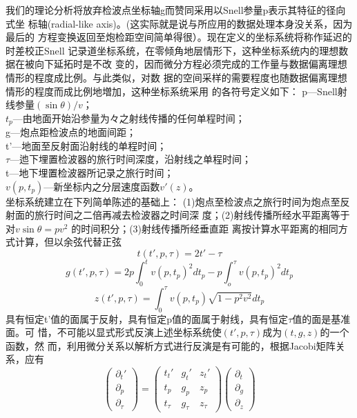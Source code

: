 我们的理论分析将放弃检波点坐标轴g而赞同采用以Snell参量p表示其特征的径向式坐
标轴(radial-like axis)。(这实际就是说与所应用的数据处理本身没关系，因为最后的
方程变换返回至炮检距空间简单得很）。现在定义的坐标系统将称作延迟的时差校正Snell
记录道坐标系统，在零倾角地层情形下，这种坐标系统内的理想数据在被向下延拓时是不改
变的，因而微分方程必须完成的工作量与数据偏离理想情形的程度成比例。与此类似，对数
据的空间采样的需要程度也随数据偏离理想情形的程度而成比例地増加，这种坐标系统采用
的各符号定义如下：
p---Snell射线参量$(\sin\theta)/v$；\\
$t_p$---由地面开始沿参量为々之射线传播的任何单程时间；\\
g---炮点距检波点的地面间距； \\
t'---地面至反射面沿射线的单程时间；\\
$\tau$---迆下埋置检波器的旅行时间深度，沿射线之单程时间；\\
t---地下埋置检波器所记录之旅行时间；\\
$v(p,t_p)$---新坐标内之分层速度函数$v'(z)$。\\
坐标系统建立在下列简单陈述的基础上：
(1)炮点至检波点之旅行时间为炮点至反射面的旅行时间之二倍再减去检波器之时间深
度；(2)射线传播所经水平距离等于对$v\sin\theta=pv^2$
的时间积分；(3)射线传播所经垂直距
离按计算水平距离的相同方式计算，但以余弦代替正弦
\begin{equation}
t(t',p,\tau)=2t'-\tau
\label{eq:ex5.7.1}
\end{equation}
\begin{equation}
g(t',p,\tau)=2p\int_0^tv(p,t_p)^2dt_p-p\int_o^{\tau}v(p,t_p)^2dt_p
\label{eq:ex5.7.2}
\end{equation}
\begin{equation}
z(t',p,\tau)=\int_0^\tau v(p,t_p)\sqrt{1-p^2v^2}dt_p
\label{eq:ex5.7.3}
\end{equation}
具有恒定t'值的面属于反射，具有恒定p值的面属于射线，具有恒定$\tau$值的面是基准面。可
惜，不可能以显式形式反演上述坐标系统使$(t',p,\tau)$成为$(t,g,z)$的一个函数，然
而，利用微分关系以解析方式进行反演是有可能的，根据Jacobi矩阵关系，应有
\begin{equation}
\begin{pmatrix}
\partial_t' \\
\partial_p \\
\partial_\tau
\end{pmatrix}=
\begin{pmatrix}
t_t' & g_t' & z_t'\\
t_p  & g_p  & z_p \\
t_\tau & g_\tau & z_\tau 
\end{pmatrix}
\begin{pmatrix}
\partial_t \\
\partial_g \\
\partial_z
\end{pmatrix}
\label{eq:ex5.7.4}
\end{equation}
